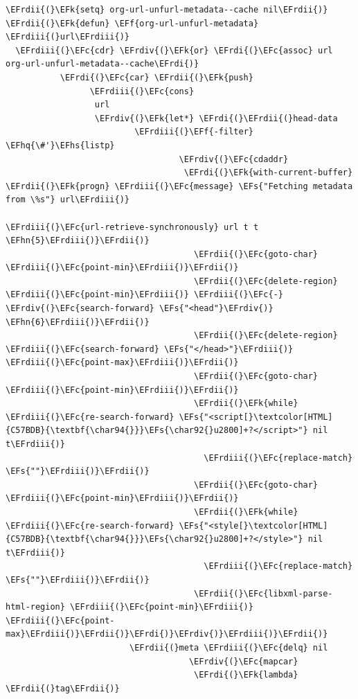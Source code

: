 \documentclass{scrartcl}
\newcommand{\EFk}[1]{\textcolor{EFk}{#1}} %
\newcommand{\EFs}[1]{\textcolor{EFs}{#1}} %
\newcommand{\EFc}[1]{\textcolor{EFc}{#1}} %
\newcommand{\EFf}[1]{\textcolor{EFf}{#1}} %
\newcommand{\EFhn}[1]{#1} %
\newcommand{\EFhq}[1]{#1} %
\newcommand{\EFhs}[1]{#1} %
\newcommand{\EFrdi}[1]{#1} %
\newcommand{\EFrdii}[1]{#1} %
\newcommand{\EFrdiii}[1]{#1} %
\newcommand{\EFrdiv}[1]{#1} %
\begin{document}
\begin{Code}
\begin{Verbatim}[]
\EFrdii{(}\EFk{setq} org-url-unfurl-metadata--cache nil\EFrdii{)}
\EFrdii{(}\EFk{defun} \EFf{org-url-unfurl-metadata} \EFrdiii{(}url\EFrdiii{)}
  \EFrdiii{(}\EFc{cdr} \EFrdiv{(}\EFk{or} \EFrdi{(}\EFc{assoc} url org-url-unfurl-metadata--cache\EFrdi{)}
           \EFrdi{(}\EFc{car} \EFrdii{(}\EFk{push}
                 \EFrdiii{(}\EFc{cons}
                  url
                  \EFrdiv{(}\EFk{let*} \EFrdi{(}\EFrdii{(}head-data
                          \EFrdiii{(}\EFf{-filter} \EFhq{\#'}\EFhs{listp}
                                   \EFrdiv{(}\EFc{cdaddr}
                                    \EFrdi{(}\EFk{with-current-buffer} \EFrdii{(}\EFk{progn} \EFrdiii{(}\EFc{message} \EFs{"Fetching metadata from \%s"} url\EFrdiii{)}
                                                                \EFrdiii{(}\EFc{url-retrieve-synchronously} url t t \EFhn{5}\EFrdiii{)}\EFrdii{)}
                                      \EFrdii{(}\EFc{goto-char} \EFrdiii{(}\EFc{point-min}\EFrdiii{)}\EFrdii{)}
                                      \EFrdii{(}\EFc{delete-region} \EFrdiii{(}\EFc{point-min}\EFrdiii{)} \EFrdiii{(}\EFc{-} \EFrdiv{(}\EFc{search-forward} \EFs{"<head"}\EFrdiv{)} \EFhn{6}\EFrdiii{)}\EFrdii{)}
                                      \EFrdii{(}\EFc{delete-region} \EFrdiii{(}\EFc{search-forward} \EFs{"</head>"}\EFrdiii{)} \EFrdiii{(}\EFc{point-max}\EFrdiii{)}\EFrdii{)}
                                      \EFrdii{(}\EFc{goto-char} \EFrdiii{(}\EFc{point-min}\EFrdiii{)}\EFrdii{)}
                                      \EFrdii{(}\EFk{while} \EFrdiii{(}\EFc{re-search-forward} \EFs{"<script[}\textcolor[HTML]{C57BDB}{\textbf{\char94{}}}\EFs{\char92{}u2800]+?</script>"} nil t\EFrdiii{)}
                                        \EFrdiii{(}\EFc{replace-match} \EFs{""}\EFrdiii{)}\EFrdii{)}
                                      \EFrdii{(}\EFc{goto-char} \EFrdiii{(}\EFc{point-min}\EFrdiii{)}\EFrdii{)}
                                      \EFrdii{(}\EFk{while} \EFrdiii{(}\EFc{re-search-forward} \EFs{"<style[}\textcolor[HTML]{C57BDB}{\textbf{\char94{}}}\EFs{\char92{}u2800]+?</style>"} nil t\EFrdiii{)}
                                        \EFrdiii{(}\EFc{replace-match} \EFs{""}\EFrdiii{)}\EFrdii{)}
                                      \EFrdii{(}\EFc{libxml-parse-html-region} \EFrdiii{(}\EFc{point-min}\EFrdiii{)} \EFrdiii{(}\EFc{point-max}\EFrdiii{)}\EFrdii{)}\EFrdi{)}\EFrdiv{)}\EFrdiii{)}\EFrdii{)}
                         \EFrdii{(}meta \EFrdiii{(}\EFc{delq} nil
                                     \EFrdiv{(}\EFc{mapcar}
                                      \EFrdi{(}\EFk{lambda} \EFrdii{(}tag\EFrdii{)}

\end{Verbatim}
\end{Code}
\end{document}

